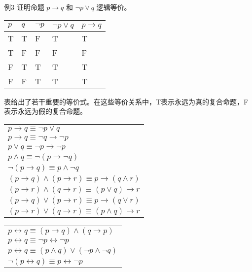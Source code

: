 例3 证明命题 $p \to q$ 和 $\neg p \lor q$ 逻辑等价。

\begin{table}
	\begin{tabular}{l|l|l|l|l}
		\hline
		$p$	&	$q$	&	$\neg p$	&	$\neg p \lor q$	&	$p \to q$	&	\\
		\hline
		T	&	T	&	F	&	T	&	T	\\
		T	&	F	&	F	&	F	&	F	\\
		F	&	T	&	T	&	T	&	T	\\
		F	&	F	&	T	&	T	&	T	\\
		\hline
	\end{tabular}
\end{table}

表给出了若干重要的等价式。在这些等价关系中，T表示永远为真的复合命题，F表示永远为假的复合命题。

\begin{table}
	\begin{tabular}{l}
		\hline
		$p \to q \equiv \neg p \lor q$	\\
		$p \to q \equiv \neg q \to \neg p$	\\
		$p \lor q \equiv \neg p \to \neg p$	\\
		$p \land q \equiv \neg(p \to \neg q)$	\\
		$\neg(p \to q) \equiv p \land \neg q$	\\
		$(p \to q) \land (p \to r) \equiv p \to (q \land r)$	\\
		$(p \to r) \land (q \to r) \equiv (p \lor q) \to r$	\\
		$(p \to q) \lor (p \to r) \equiv p \to (q \lor r)$	\\
		$(p \to r) \lor (q \to r) \equiv (p \land q) \to r$	\\
		\hline
	\end{tabular}
\end{table}

\begin{table}
	\begin{tabular}{l}
		\hline
		$p \leftrightarrow q \equiv (p \to q) \land (q \to p)$	\\
		$p \leftrightarrow q \equiv \neg p \leftrightarrow \neg p$	\\
		$p \leftrightarrow q \equiv (p \land q) \lor (\neg p \land \neg q)$	\\
		$\neg(p \leftrightarrow q) \equiv p \leftrightarrow \neg p$	\\
		\hline
	\end{tabular}
\end{table}
